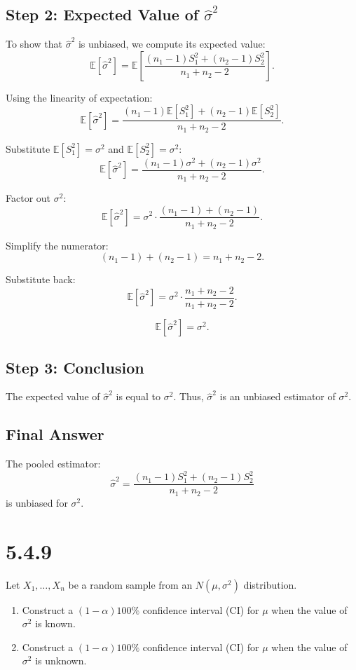 \documentclass{article}
\begin{document}
\subsection*{Step 2: Expected Value of $\hat{\sigma}^2$}
To show that $\hat{\sigma}^2$ is unbiased, we compute its expected value:
\[
\mathbb{E}[\hat{\sigma}^2] = \mathbb{E}\left[\frac{(n_1 - 1)S_1^2 + (n_2 - 1)S_2^2}{n_1 + n_2 - 2}\right].
\]

Using the linearity of expectation:
\[
\mathbb{E}[\hat{\sigma}^2] = \frac{(n_1 - 1)\mathbb{E}[S_1^2] + (n_2 - 1)\mathbb{E}[S_2^2]}{n_1 + n_2 - 2}.
\]

Substitute $\mathbb{E}[S_1^2] = \sigma^2$ and $\mathbb{E}[S_2^2] = \sigma^2$:
\[
\mathbb{E}[\hat{\sigma}^2] = \frac{(n_1 - 1)\sigma^2 + (n_2 - 1)\sigma^2}{n_1 + n_2 - 2}.
\]

Factor out $\sigma^2$:
\[
\mathbb{E}[\hat{\sigma}^2] = \sigma^2 \cdot \frac{(n_1 - 1) + (n_2 - 1)}{n_1 + n_2 - 2}.
\]

Simplify the numerator:
\[
(n_1 - 1) + (n_2 - 1) = n_1 + n_2 - 2.
\]

Substitute back:
\[
\mathbb{E}[\hat{\sigma}^2] = \sigma^2 \cdot \frac{n_1 + n_2 - 2}{n_1 + n_2 - 2}.
\]

\[
\mathbb{E}[\hat{\sigma}^2] = \sigma^2.
\]

\subsection*{Step 3: Conclusion}
The expected value of $\hat{\sigma}^2$ is equal to $\sigma^2$. Thus, $\hat{\sigma}^2$ is an unbiased estimator of $\sigma^2$.

\subsection*{Final Answer}
The pooled estimator:
\[
\hat{\sigma}^2 = \frac{(n_1 - 1)S_1^2 + (n_2 - 1)S_2^2}{n_1 + n_2 - 2}
\]
is unbiased for $\sigma^2$.

\section*{5.4.9}

Let $X_1, \dots, X_n$ be a random sample from an $N(\mu, \sigma^2)$ distribution.

\begin{enumerate}
    \item[(a)] Construct a $(1 - \alpha)100\%$ confidence interval (CI) for $\mu$ when the value of $\sigma^2$ is known.
    \item[(b)] Construct a $(1 - \alpha)100\%$ confidence interval (CI) for $\mu$ when the value of $\sigma^2$ is unknown.
\end{enumerate}
\end{document}
